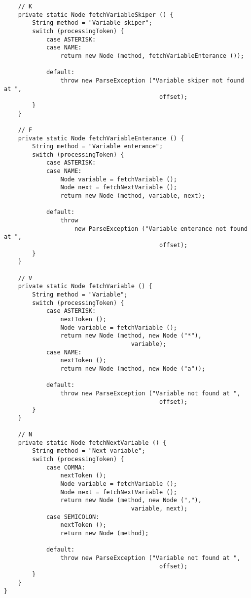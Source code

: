 \documentclass[12pt]{article}
\begin{document}
\begin{itemize}
\begin{verbatim}
    // K
    private static Node fetchVariableSkiper () {
        String method = "Variable skiper";
        switch (processingToken) {
            case ASTERISK:
            case NAME:
                return new Node (method, fetchVariableEnterance ());
                
            default:
                throw new ParseException ("Variable skiper not found at ", 
                                            offset);
        }
    }
    
    // F
    private static Node fetchVariableEnterance () {
        String method = "Variable enterance";
        switch (processingToken) {
            case ASTERISK:
            case NAME:
                Node variable = fetchVariable ();
                Node next = fetchNextVariable ();
                return new Node (method, variable, next);
                
            default:
                throw 
                    new ParseException ("Variable enterance not found at ", 
                                            offset);
        }
    }
    
    // V
    private static Node fetchVariable () {
        String method = "Variable";
        switch (processingToken) {
            case ASTERISK:
                nextToken ();
                Node variable = fetchVariable ();
                return new Node (method, new Node ("*"), 
                                    variable);
            case NAME:
                nextToken ();
                return new Node (method, new Node ("a"));
                
            default:
                throw new ParseException ("Variable not found at ", 
                                            offset);
        }
    }
    
    // N
    private static Node fetchNextVariable () {
        String method = "Next variable";
        switch (processingToken) {
            case COMMA:
                nextToken ();
                Node variable = fetchVariable ();
                Node next = fetchNextVariable ();
                return new Node (method, new Node (","), 
                                    variable, next);
            case SEMICOLON:
                nextToken ();
                return new Node (method);
                
            default:
                throw new ParseException ("Variable not found at ", 
                                            offset);
        }
    }
}
        \end{verbatim}				




\end{itemize}
\end{document}
